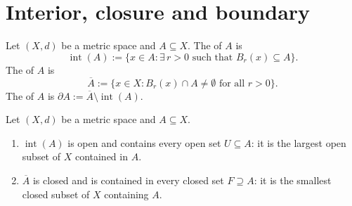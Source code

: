 \section{Interior, closure and boundary}
\label{sec:interior_closure_boundary}

\begin{definition}
\label{def:interior_closure_boundary}
Let $(X,d)$ be a metric space and $A \subseteq X$. The 
 of $A$ is
\[\operatorname{int}(A) := \{x \in A : \exists\, r>0 \text{ such that } B_r(x) \subseteq A\}.\]
The   of $A$ is
\[\overline{A} := \{x \in X : B_r(x) \cap A \neq \emptyset \text{ for all } r > 0\}.\]
The   of $A$ is
$\partial A := \overline{A} \setminus \operatorname{int}(A)$.
\end{definition}

\begin{proposition}
\label{prop:interior_closure_extremal}
Let $(X,d)$ be a metric space and $A \subseteq X$.
\begin{enumerate}[label=\textbf{(\alph*)}]
  \item $\operatorname{int}(A)$ is open and contains every open set $U \subseteq A$: it is the
    largest open subset of $X$ contained in $A$.
  \item $\overline{A}$ is closed and is contained in every closed set $F \supseteq A$: it is the
    smallest closed subset of $X$ containing $A$.
\end{enumerate}
\end{proposition}


